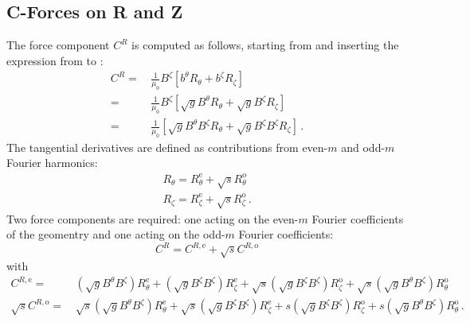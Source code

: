 \subsection{C-Forces on R and Z}
The force component $C^R$ is computed as follows, starting from 
and inserting the expression from  to :
\begin{align}
  C^R =&\, \frac{1}{\mu_0} B^\zeta \left[          b^\theta         R_\theta +          b^\zeta         R_\zeta \right] \nonumber \\
      =&\, \frac{1}{\mu_0} B^\zeta \left[ \sqrt{g} B^\theta         R_\theta + \sqrt{g} B^\zeta         R_\zeta \right] \nonumber \\
      =&\, \frac{1}{\mu_0}         \left[ \sqrt{g} B^\theta B^\zeta R_\theta + \sqrt{g} B^\zeta B^\zeta R_\zeta \right] \, .
\end{align}
The tangential derivatives are defined as contributions from even-$m$ and odd-$m$ Fourier harmonics:
\begin{align}
  R_\theta = R_\theta^\mathrm{e} + \sqrt{s} R_\theta^\mathrm{o} \nonumber \\
   R_\zeta =  R_\zeta^\mathrm{e} + \sqrt{s}  R_\zeta^\mathrm{o} \, .
\end{align}
Two force components are required: one acting on the even-$m$ Fourier coefficients of the geomentry
and one acting on the odd-$m$ Fourier coefficients:
\begin{equation}
  C^R = C^{R,\mathrm{e}} + \sqrt{s} C^{R,\mathrm{o}}
\end{equation}
with
\begin{align}
  C^{R,\mathrm{e}} =&\,                     \left( \sqrt{g} B^\theta  B^\zeta \right) R_\theta^\mathrm{e}
                                 +          \left( \sqrt{g}  B^\zeta  B^\zeta \right)  R_\zeta^\mathrm{e}
                                 + \sqrt{s} \left( \sqrt{g}  B^\zeta  B^\zeta \right)  R_\zeta^\mathrm{o}
                                 + \sqrt{s} \left( \sqrt{g} B^\theta  B^\zeta \right) R_\theta^\mathrm{o} \nonumber \\
  \sqrt{s} C^{R,\mathrm{o}} =&\,   \sqrt{s} \left( \sqrt{g} B^\theta  B^\zeta \right) R_\theta^\mathrm{e}
                                 + \sqrt{s} \left( \sqrt{g}  B^\zeta  B^\zeta \right)  R_\zeta^\mathrm{e}
                                 +       s  \left( \sqrt{g}  B^\zeta  B^\zeta \right)  R_\zeta^\mathrm{o}
                                 +       s  \left( \sqrt{g} B^\theta  B^\zeta \right) R_\theta^\mathrm{o} \, .
\end{align}
